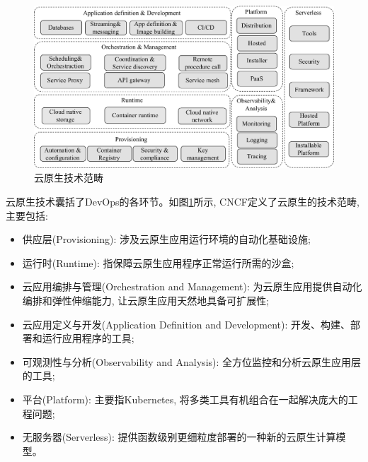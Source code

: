 \begin{figure}[h] %
    \centering %
    \includegraphics[width=1.0 \textwidth]{FIGs/chapter2/cloud_native_landscape.pdf} %
    \caption{云原生技术范畴} %
    \label{cloud_native_landscape} %
\end{figure}%

云原生技术囊括了DevOps的各环节。如图\ref{cloud_native_landscape}所示, CNCF定义了云原生的技术范畴, 主要包括: 

\begin{itemize}[itemindent=2em]
    \item 供应层(Provisioning): 涉及云原生应用运行环境的自动化基础设施;

    \item 运行时(Runtime): 指保障云原生应用程序正常运行所需的沙盒;

    \item 云应用编排与管理(Orchestration and Management): 为云原生应用提供自动化编排和弹性伸缩能力, 让云原生应用天然地具备可扩展性;

    \item 云应用定义与开发(Application Definition and Development): 开发、构建、部署和运行应用程序的工具;

    \item 可观测性与分析(Observability and Analysis): 全方位监控和分析云原生应用层的工具;

    \item 平台(Platform): 主要指Kubernetes, 将多类工具有机组合在一起解决庞大的工程问题;

    \item 无服务器(Serverless): 提供函数级别更细粒度部署的一种新的云原生计算模型。
\end{itemize}


